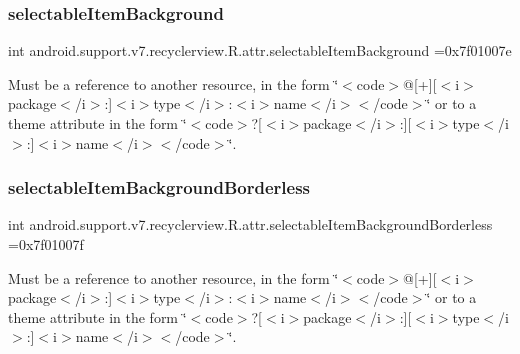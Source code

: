 \subsubsection{\texorpdfstring{selectable\+Item\+Background}{selectableItemBackground}}
{\footnotesize\ttfamily int android.\+support.\+v7.\+recyclerview.\+R.\+attr.\+selectable\+Item\+Background =0x7f01007e\hspace{0.3cm}{\ttfamily [static]}}

Must be a reference to another resource, in the form \char`\"{}$<$code$>$@\mbox{[}+\mbox{]}\mbox{[}$<$i$>$package$<$/i$>$\+:\mbox{]}$<$i$>$type$<$/i$>$\+:$<$i$>$name$<$/i$>$$<$/code$>$\char`\"{} or to a theme attribute in the form \char`\"{}$<$code$>$?\mbox{[}$<$i$>$package$<$/i$>$\+:\mbox{]}\mbox{[}$<$i$>$type$<$/i$>$\+:\mbox{]}$<$i$>$name$<$/i$>$$<$/code$>$\char`\"{}. \mbox{\label{classandroid_1_1support_1_1v7_1_1recyclerview_1_1R_1_1attr_afe6bf2d2a2eb019626350bef2a6cbec3}} 
\subsubsection{\texorpdfstring{selectable\+Item\+Background\+Borderless}{selectableItemBackgroundBorderless}}
{\footnotesize\ttfamily int android.\+support.\+v7.\+recyclerview.\+R.\+attr.\+selectable\+Item\+Background\+Borderless =0x7f01007f\hspace{0.3cm}{\ttfamily [static]}}

Must be a reference to another resource, in the form \char`\"{}$<$code$>$@\mbox{[}+\mbox{]}\mbox{[}$<$i$>$package$<$/i$>$\+:\mbox{]}$<$i$>$type$<$/i$>$\+:$<$i$>$name$<$/i$>$$<$/code$>$\char`\"{} or to a theme attribute in the form \char`\"{}$<$code$>$?\mbox{[}$<$i$>$package$<$/i$>$\+:\mbox{]}\mbox{[}$<$i$>$type$<$/i$>$\+:\mbox{]}$<$i$>$name$<$/i$>$$<$/code$>$\char`\"{}. \mbox{\label{classandroid_1_1support_1_1v7_1_1recyclerview_1_1R_1_1attr_a099cf6607a5322614fa0832c75cc539f}} 
